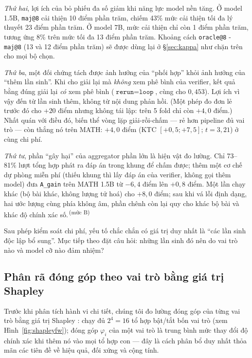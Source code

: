 \documentclass[11pt,a4paper]{article}
\newcommand{\mucB}{\textsuperscript{\,(mức B)}}
\begin{document}
\emph{Thứ hai}, lợi ích của bỏ phiếu đa số giảm khi năng lực model nền tăng. Ở model 1.5B, \texttt{maj@8} cải thiện 10 điểm phần trăm, chiếm 43\% mức cải thiện tối đa lý thuyết 23 điểm phần trăm. Ở model 7B, mức cải thiện chỉ còn 1 điểm phần trăm, tương ứng 8\% trên mức tối đa 13 điểm phần trăm. Khoảng cách \texttt{oracle@8} - \texttt{maj@8} (13 và 12 điểm phần trăm) sẽ được dùng lại ở \S\ref{sec:kappa} như chặn trên cho mọi bộ chọn.

\emph{Thứ ba}, một đối chứng tách được ảnh hưởng của ``phối hợp'' khỏi ảnh hưởng của ``thêm lần sinh''. Khi cho giải lại mà \emph{không} xem phê bình của verifier, kết quả bằng đúng giải lại \emph{có} xem phê bình ($\texttt{rerun} = \texttt{loop}$, cùng cho $0{,}453$). Lợi ích vì vậy đến từ lần sinh thêm, không từ nội dung phản hồi. (Một phép đo đơn lẻ trước đó cho $+20$ điểm nhưng không tái lập: trên 5 fold chỉ còn $+4{,}0$ điểm.) Nhất quán với điều đó, biến thể vòng lặp giải-rồi-chấm --- rẻ hơn pipeline đủ vai trò --- còn thắng nó trên MATH: $+4{,}0$ điểm (KTC $[+0{,}5;+7{,}5]$; $t=3{,}21$) ở cùng chi phí.

\emph{Thứ tư}, phần ``gây hại'' của aggregator phần lớn là hiện vật đo lường. Chỉ 73--81\% lượt tổng hợp phát ra đáp án trong khung để chấm được; thêm một cơ chế dự phòng miễn phí (thiếu khung thì lấy đáp án của verifier, không gọi thêm model) đưa \texttt{A\_gain} trên MATH 1.5B từ $-6{,}4$ điểm lên $+0{,}8$ điểm. Một lần chạy khác (bộ bài khác, không lượng tử hoá) cho $+8{,}0$ điểm; sau khi vá lỗi định dạng, hai ước lượng cùng phía không âm, phần chênh còn lại quy cho khác bộ bài và khác độ chính xác số.\mucB

Sau phép kiểm soát chi phí, yếu tố chắc chắn có giá trị duy nhất là ``các lần sinh độc lập bổ sung''. Mục tiếp theo đặt câu hỏi: những lần sinh đó nên do vai trò nào và model cỡ nào đảm nhiệm?

\subsection{Phân rã đóng góp theo vai trò bằng giá trị Shapley}\label{sec:shapley}

Trước khi phân tích hành vi chi tiết, chúng tôi đo lường đóng góp của từng vai trò bằng giá trị Shapley \cite{shapley1953}: chạy đủ $2^4 = 16$ tổ hợp bật/tắt bốn vai trò (xem Hình~\ref{fig:shapleyfw}); đóng góp $\varphi_i$ của một vai trò là trung bình mức thay đổi độ chính xác khi thêm nó vào mọi tổ hợp con --- đây là cách phân bổ duy nhất thỏa mãn các tiên đề về hiệu quả, đối xứng và cộng tính.
\end{document}
